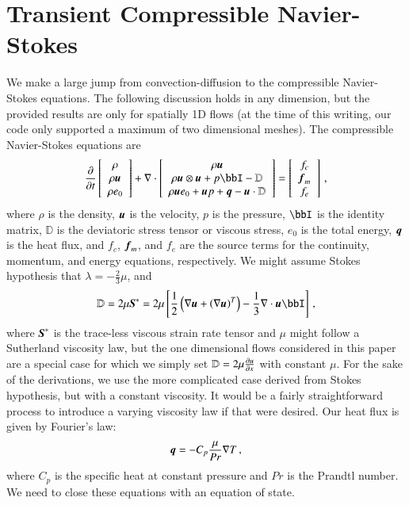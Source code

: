 \documentclass[preprint,12pt]{elsarticle}
\begin{document}
\section{Transient Compressible Navier-Stokes}


We make a large jump from convection-diffusion to the compressible Navier-Stokes equations.
The following discussion holds in any dimension, but the provided results are only for spatially 1D flows 
(at the time of this writing, our code only supported a maximum of two dimensional meshes).
The compressible Navier-Stokes equations are
\begin{align}
\frac{\partial}{\partial t}\svectthree{\rho}{\rho\bfu}{\rho e_0}
+\Div\svectthree{\rho\bfu}{\rho\bfu\otimes\bfu+p\bbI-\mathbb{D}}{\rho\bfu e_0+\bfu p+\bfq-\bfu\cdot\mathbb{D}}
=\svectthree{f_c}{\bff_m}{f_e}\,,
\end{align}
where $\rho$ is the density, $\boldsymbol u$ is the velocity, $p$ is the pressure, $\bbI$ is the identity matrix,
$\mathbb{D}$ is the deviatoric stress tensor or viscous stress, $e_0$ is the total energy, $\boldsymbol q$ is the heat flux, 
and $f_c$, $\boldsymbol f_m$, and $f_e$ are the source terms for the continuity, momentum, and energy equations, respectively.
We might assume Stokes hypothesis that $\lambda=-\frac{2}{3}\mu$, 
and
\begin{equation*}
	\mathbb{D}=2\mu\bfS^*=2\mu\LRs{\frac{1}{2}\LRp{\Grad\bfu+\LRp{\Grad\bfu}^T}-\frac{1}{3}\Div\bfu\bbI}\,,
\end{equation*}
where $\boldsymbol S^*$ is the trace-less viscous strain rate tensor and $\mu$ might follow a Sutherland viscosity law, 
but the one dimensional flows considered in this paper are a special case for which we simply set $\mathbb{D}=2\mu\frac{\partial u}{\partial x}$
with constant $\mu$.
For the sake of the derivations, we use the more complicated case derived from Stokes hypothesis, but with a constant viscosity.
It would be a fairly straightforward process to introduce a varying viscosity law if that were desired.
Our heat flux is given by Fourier's law:
\begin{equation*}
	\boldsymbol q=-C_p\frac{\mu}{Pr}\nabla T\,,
\end{equation*}
where $C_p$ is the specific heat at constant pressure and $Pr$ is the Prandtl number.
We need to close these equations with an equation of state. 
\end{document}
